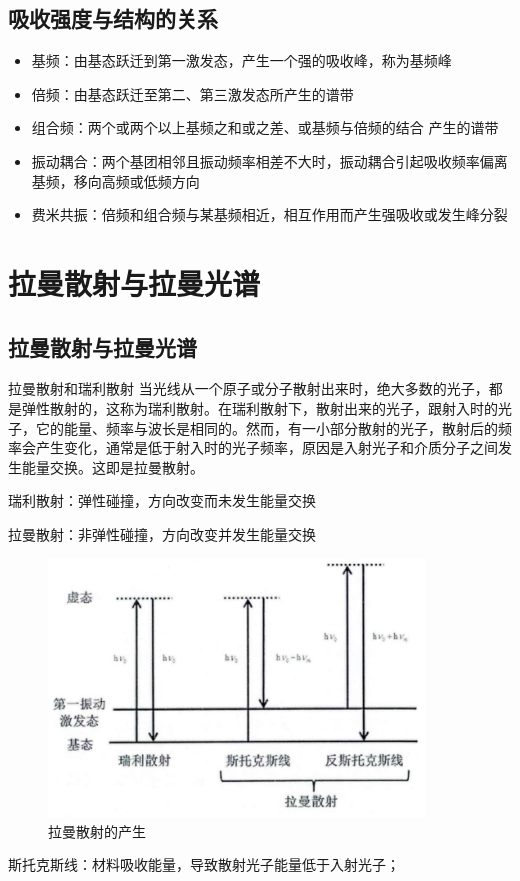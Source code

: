 \subsection{吸收强度与结构的关系}
	\begin{itemize}
		\item 基频：由基态跃迁到第一激发态，产生一个强的吸收峰，称为基频峰
		\item 倍频：由基态跃迁至第二、第三激发态所产生的谱带
		\item 组合频：两个或两个以上基频之和或之差、或基频与倍频的结合 产生的谱带
		\item 振动耦合：两个基团相邻且振动频率相差不大时，振动耦合引起吸收频率偏离基频，移向高频或低频方向
		\item 费米共振：倍频和组合频与某基频相近，相互作用而产生强吸收或发生峰分裂
	\end{itemize}

                         

\section{拉曼散射与拉曼光谱}
\subsection{拉曼散射与拉曼光谱}
\begin{definition*}{拉曼散射和瑞利散射}
    当光线从一个原子或分子散射出来时，绝大多数的光子，都是弹性散射的，这称为瑞利散射。在瑞利散射下，散射出来的光子，跟射入时的光子，它的能量、频率与波长是相同的。然而，有一小部分散射的光子，散射后的频率会产生变化，通常是低于射入时的光子频率，原因是入射光子和介质分子之间发生能量交换。这即是拉曼散射。
\end{definition*}
\begin{note}
    瑞利散射：弹性碰撞，方向改变而未发生能量交换

    拉曼散射：非弹性碰撞，方向改变并发生能量交换
\end{note}
\begin{figure}[ht]
    \centering
    \includegraphics[width=10cm]{image/chp5_sers.png}
    \caption{拉曼散射的产生}
    \label{fig:chp5_laman}
\end{figure}
斯托克斯线：材料吸收能量，导致散射光子能量低于入射光子；


